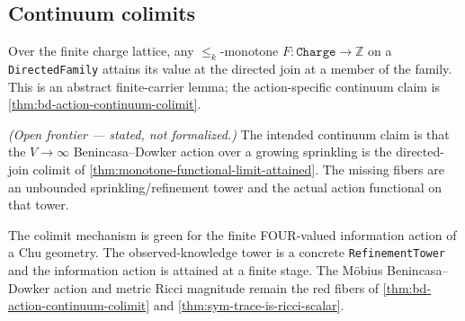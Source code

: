 \subsection{Continuum colimits}

\begin{theorem}\label{thm:monotone-functional-limit-attained}\leanok{}
Over the finite charge lattice, any $\le_k$-monotone
$F:\texttt{Charge}\to\mathbb Z$ on a \texttt{DirectedFamily} attains its value at
the directed join at a member of the family.  This is an abstract finite-carrier
lemma; the action-specific continuum claim is \cref{thm:bd-action-continuum-colimit}.
\end{theorem}

\begin{theorem}\label{thm:bd-action-continuum-colimit}\notready{}
\emph{(Open frontier --- stated, not formalized.)} The intended continuum claim
is that the $V\to\infty$ Benincasa--Dowker action over a growing sprinkling is the
directed-join colimit of \cref{thm:monotone-functional-limit-attained}.  The
missing fibers are an unbounded sprinkling/refinement tower and the actual action
functional on that tower.
\end{theorem}

\begin{theorem}\label{thm:chu-info-action-colimit}\leanok{}
The colimit mechanism is green for the finite FOUR-valued information action of a
Chu geometry.  The observed-knowledge tower is a concrete \texttt{RefinementTower}
and the information action is attained at a finite stage.  The M\"obius
Benincasa--Dowker action and metric Ricci magnitude remain the red fibers of
\cref{thm:bd-action-continuum-colimit} and \cref{thm:sym-trace-is-ricci-scalar}.
\end{theorem}
